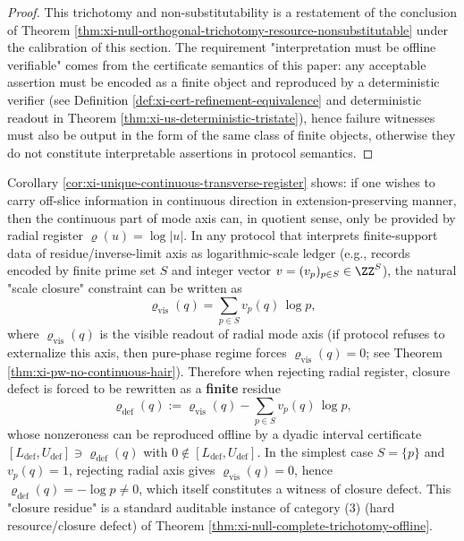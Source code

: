 \begin{proof}
This trichotomy and non-substitutability is a restatement of the conclusion of Theorem \ref{thm:xi-null-orthogonal-trichotomy-resource-nonsubstitutable} under the calibration of this section.
The requirement "interpretation must be offline verifiable" comes from the certificate semantics of this paper: any acceptable assertion must be encoded as a finite object and reproduced by a deterministic verifier (see Definition \ref{def:xi-cert-refinement-equivalence} and deterministic readout in Theorem \ref{thm:xi-us-deterministic-tristate}), hence failure witnesses must also be output in the form of the same class of finite objects, otherwise they do not constitute interpretable assertions in protocol semantics.
\end{proof}

\begin{remark}\label{rem:xi-null-closure-defect-finite-prime-witness}
Corollary \ref{cor:xi-unique-continuous-transverse-register} shows: if one wishes to carry off-slice information in continuous direction in extension-preserving manner, then the continuous part of mode axis can, in quotient sense, only be provided by radial register \(\varrho(u)=\log|u|\).
In any protocol that interprets finite-support data of residue/inverse-limit axis as logarithmic-scale ledger (e.g., records encoded by finite prime set \(S\) and integer vector \(v=(v_p)_{p\in S}\in\ZZ^{S}\)), the natural "scale closure" constraint can be written as
\[
\varrho_{\mathrm{vis}}(q)=\sum_{p\in S} v_p(q)\,\log p,
\]
where \(\varrho_{\mathrm{vis}}(q)\) is the visible readout of radial mode axis (if protocol refuses to externalize this axis, then pure-phase regime forces \(\varrho_{\mathrm{vis}}(q)=0\); see Theorem \ref{thm:xi-pw-no-continuous-hair}).
Therefore when rejecting radial register, closure defect is forced to be rewritten as a \textbf{finite} residue
\[
\varrho_{\mathrm{def}}(q):=\varrho_{\mathrm{vis}}(q)-\sum_{p\in S} v_p(q)\,\log p,
\]
whose nonzeroness can be reproduced offline by a dyadic interval certificate \([L_{\mathrm{def}},U_{\mathrm{def}}]\ni \varrho_{\mathrm{def}}(q)\) with \(0\notin [L_{\mathrm{def}},U_{\mathrm{def}}]\).
In the simplest case \(S=\{p\}\) and \(v_p(q)=1\), rejecting radial axis gives \(\varrho_{\mathrm{vis}}(q)=0\), hence
\(
\varrho_{\mathrm{def}}(q)=-\log p\neq 0
\),
which itself constitutes a witness of closure defect.
This "closure residue" is a standard auditable instance of category (3) (hard resource/closure defect) of Theorem \ref{thm:xi-null-complete-trichotomy-offline}.
\end{remark}

